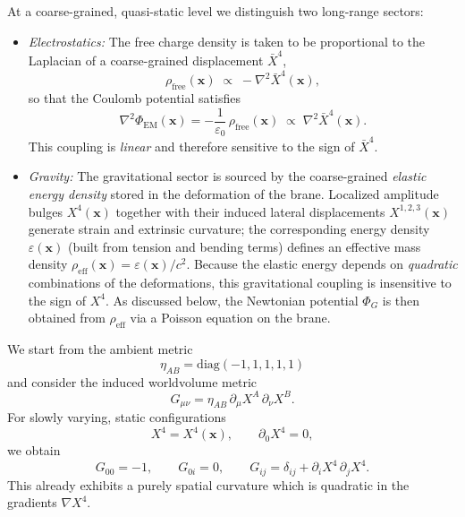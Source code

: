 At a coarse-grained, quasi-static level we distinguish two long-range sectors:
\begin{itemize}
  \item \emph{Electrostatics:} The free charge density is taken to be proportional to the Laplacian of a coarse-grained displacement $\bar X^4$,
  \begin{equation}
    \rho_{\mathrm{free}}(\mathbf x)
    \;\propto\;
    - \nabla^2 \bar X^4(\mathbf x),
  \end{equation}
  so that the Coulomb potential satisfies
  \begin{equation}
    \nabla^2 \Phi_{\mathrm{EM}}(\mathbf x)
    = - \frac{1}{\varepsilon_0}\,\rho_{\mathrm{free}}(\mathbf x)
    \;\propto\;
    \nabla^2 \bar X^4(\mathbf x).
  \end{equation}
  This coupling is \emph{linear} and therefore sensitive to the sign of $\bar X^4$.
  \item \emph{Gravity:} The gravitational sector is sourced by the
        coarse-grained \emph{elastic energy density} stored in the
        deformation of the brane. Localized amplitude bulges
        $X^4(\mathbf x)$ together with their induced lateral
        displacements $X^{1,2,3}(\mathbf x)$ generate strain and
        extrinsic curvature; the corresponding energy density
        $\varepsilon(\mathbf x)$ (built from tension and bending
        terms) defines an effective mass density
        $\rho_\text{eff}(\mathbf x) = \varepsilon(\mathbf x)/c^2$.
        Because the elastic energy depends on \emph{quadratic}
        combinations of the deformations, this gravitational coupling
        is insensitive to the sign of $X^4$. As discussed below, the
        Newtonian potential $\Phi_G$ is then obtained from
        $\rho_\text{eff}$ via a Poisson equation on the brane.
\end{itemize}

We start from the ambient metric
\begin{equation}
  \eta_{AB} = \mathrm{diag}(-1,1,1,1,1)
\end{equation}
and consider the induced worldvolume metric
\begin{equation}
  G_{\mu\nu} = \eta_{AB}\,\partial_\mu X^A\,\partial_\nu X^B.
\end{equation}
For slowly varying, static configurations
\begin{equation}
  X^4 = X^4(\mathbf x),
  \qquad
  \partial_0 X^4 = 0,
\end{equation}
we obtain
\begin{equation}
  G_{00} = -1,
  \qquad
  G_{0i} = 0,
  \qquad
  G_{ij} = \delta_{ij} + \partial_i X^4\,\partial_j X^4.
\end{equation}
This already exhibits a purely spatial curvature which is quadratic in the gradients $\nabla X^4$.

